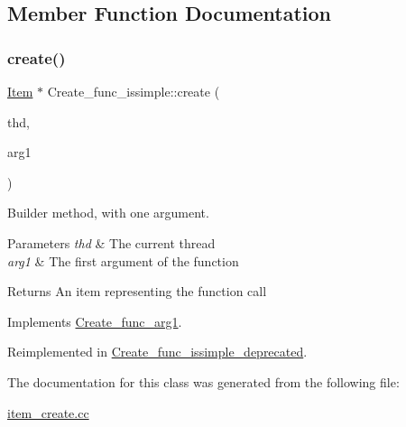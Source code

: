 \subsection{Member Function Documentation}
\mbox{\label{classCreate__func__issimple_af481363c8e501313e097212ada345419}} 
\subsubsection{\texorpdfstring{create()}{create()}}
{\footnotesize\ttfamily \mbox{\hyperlink{classItem}{Item}} $\ast$ Create\+\_\+func\+\_\+issimple\+::create (\begin{DoxyParamCaption}\item[{T\+HD $\ast$}]{thd,  }\item[{\mbox{\hyperlink{classItem}{Item}} $\ast$}]{arg1 }\end{DoxyParamCaption})\hspace{0.3cm}{\ttfamily [virtual]}}

Builder method, with one argument. 
\begin{DoxyParams}{Parameters}
{\em thd} & The current thread \\
\hline
{\em arg1} & The first argument of the function \\
\hline
\end{DoxyParams}
\begin{DoxyReturn}{Returns}
An item representing the function call 
\end{DoxyReturn}


Implements \mbox{\hyperlink{classCreate__func__arg1_a3e9a98f755cd82c3e762e334c955a8c9}{Create\+\_\+func\+\_\+arg1}}.



Reimplemented in \mbox{\hyperlink{classCreate__func__issimple__deprecated_a58df8393700d5dfea4493b0568fa94f6}{Create\+\_\+func\+\_\+issimple\+\_\+deprecated}}.



The documentation for this class was generated from the following file\+:\begin{DoxyCompactItemize}
\item 
\mbox{\hyperlink{item__create_8cc}{item\+\_\+create.\+cc}}\end{DoxyCompactItemize}

